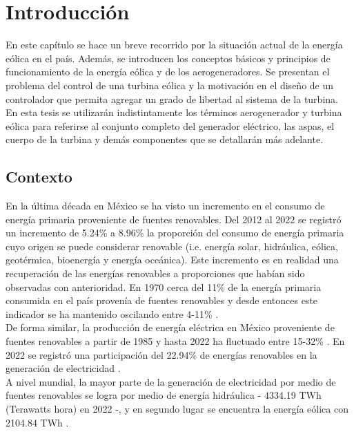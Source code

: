 \chapter{Introducción} \label{intro_chapter}

En este capítulo se hace un breve recorrido por la situación actual de la energía eólica en el país. Además, se introducen los conceptos básicos y principios de funcionamiento de la energía eólica y de los aerogeneradores. Se presentan el problema del control de una turbina eólica y la motivación en el diseño de un controlador que permita agregar un grado de libertad al sistema de la turbina. 
\\

\noindent En esta tesis se utilizarán indistintamente los términos aerogenerador y turbina eólica para referirse al conjunto completo del generador eléctrico, las aspas, el cuerpo de la turbina y demás componentes que se detallarán más adelante. 


\section{Contexto}
\noindent En la última década en México se ha visto un incremento en el consumo de energía primaria proveniente de fuentes renovables. Del 2012 al 2022 se registró un incremento de 5.24\% a 8.96\% la proporción del consumo de energía primaria cuyo origen se puede considerar renovable (i.e. energía solar, hidráulica, eólica, geotérmica, bioenergía y energía oceánica). Este incremento es en realidad una recuperación de las energías renovables a proporciones que habían sido observadas con anterioridad. En 1970 cerca del 11\% de la energía primaria consumida en el país provenía de fuentes renovables y desde entonces este indicador se ha mantenido oscilando entre 4-11\% \cite{statistical-review}.
\\

\noindent De forma similar, la producción de energía eléctrica en México proveniente de fuentes renovables a partir de 1985 y hasta 2022 ha fluctuado entre 15-32\% \cite{statistical-review}. En 2022 se registró una participación del 22.94\% de energías renovables en la generación de electricidad \cite{owid-renewable-energy}.
\\

\noindent A nivel mundial, la mayor parte de la generación de electricidad por medio de fuentes renovables se logra por medio de energía hidráulica - 4334.19 TWh (Terawatts hora) en 2022 -, y en segundo lugar se encuentra la energía eólica con 2104.84 TWh \cite{owid-renewable-energy}.
\\

